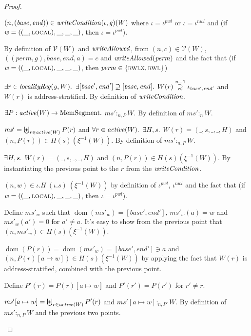 \documentclass[a4paper]{article}
\newcommand{\update}[2]{[#1 \mapsto #2]}
\newcommand\supsetsim{\mathrel{\ooalign{\raise.2ex\hbox{$\supset$}\cr
      \hidewidth\lower.8ex\hbox{\scalebox{0.9}{$\sim$}}\hidewidth\cr}}}
\newcommand{\nsupsim}[1][n]{\stackrel{\tiny{#1}}{\supsetsim}}
\DeclareMathOperator{\dom}{dom}
\newcommand{\var}[1]{\mathit{#1}}
\newcommand{\hs}{\var{ms}}
\newcommand{\ms}{\hs}
\newcommand{\gl}{\var{g}}
\newcommand{\addr}{\var{a}}
\newcommand{\start}{\var{base}}
\newcommand{\addrend}{\var{end}}
\newcommand{\heap}{\var{mem}}
\newcommand{\perm}{\var{perm}}
\newcommand{\nwl}{\var{nwl}}
\newcommand{\pwl}{\var{pwl}}
\newcommand{\plainfun}[2]{
  \ifthenelse{\equal{#2}{}}
  {\mathit{#1}}
  {\mathit{#1}(#2)}
}
\newcommand{\writeAllowed}[1]{\plainfun{writeAllowed}{#1}}
\newcommand{\writeCond}[1]{\plainfun{writeCondition}{#1}}
\newcommand{\activeReg}[1]{\plainfun{active}{#1}}
\newcommand{\heapSat}[3][\heap]{#1 :_{#2} #3}
\newcommand{\memSatPar}[4][n]{\heapSat[#2]{#1 , #4}{#3}}
\newcommand{\asmType}{\plaindom{AsmType}}
\newcommand{\plaindom}[1]{\mathrm{#1}}
\newcommand{\HeapSegments}{\plaindom{MemSegment}}
\newcommand{\intr}[2]{\mathcal{#1}}
\newcommand{\valueintr}[1]{\intr{V}{#1}}
\newcommand{\stdvr}{\valueintr{\asmType}}
\newcommand{\npair}[2][n]{\left(#1,#2 \right)}
\newcommand{\plainperm}[1]{\textsc{#1}}
\newcommand{\readwritel}{\plainperm{rwl}}
\newcommand{\rwlx}{\plainperm{rwlx}}
\newcommand{\local}{\plainperm{local}}
\begin{document}
 \begin{proof}
   \begin{enumproof}
   \item $\npair{(\start,\addrend)} \in \writeCond{}(\iota,\gl)(W)$ where $\iota
     = \iota^\pwl$ or $\iota = \iota^\nwl$ and (if $\var{w} =
     ((\_,\local),\_,\_,\_)$, then $\iota = \iota^\pwl$).

     By definition of $\stdvr(W)$ and $\writeAllowed{}$, from
     $\npair{c}\in\stdvr(W)$, $((\perm,\gl),\start,\addrend,\addr) = c$ and
     $\writeAllowed{\perm}$ and the fact that (if $\var{w} =
     ((\_,\local),\_,\_,\_)$, then $\perm \in \{\rwlx,\readwritel \}$)
   \item $\exists r \in \var{localityReg}(\gl,W) \ldotp$ $\exists
     [\start',\addrend'] \supseteq [\start,\addrend] \ldotp$ $W(r)\nsupsim[n-1]
     \iota_{\start',\addrend'}$ and $W(r)$ is address-stratified. By definition
     of $\writeCond{}$.
   \item $\exists P : \activeReg{W} \rightarrow \HeapSegments \ldotp$
     $\memSatPar{\ms'}{W}{P}$. By definition of $\heapSat[\ms']{n}{W}$.
   \item $\ms' = \biguplus_{r\in\activeReg{W}}P(r)$ and $\forall r \in
     \activeReg{W} \ldotp$ $\exists H,s \ldotp$ $W(r) = (\_,s,\_,\_,H)$ and
     $\npair[n]{P(r)} \in H(s)(\xi^{-1}(W))$. By definition of
     $\memSatPar{\ms'}{W}{P}$.
   \item $\exists H,s \ldotp$ $W(r) = (\_,s,\_,\_,H)$ and
     $\npair[n]{P(r)} \in H(s)(\xi^{-1}(W))$. By instantiating the previous
     point to the $r$ from the $\writeCond{}$.
   \item $\npair{w} \in \iota.H~(\iota.s)~(\xi^{-1}(W))$ by definition of
     $\iota^\pwl$, $\iota^\nwl$ and the fact that (if $\var{w} =
     ((\_,\local),\_,\_,\_)$, then $\iota = \iota^\pwl$).
   \item Define $\ms'_w$ such that $\dom(\ms'_w) = [\start',\addrend']$,
     $\ms'_w(\addr) = w$ and $\ms'_w(\addr') = 0$ for $\addr' \neq \addr$. It's
     easy to show from the previous point that $\npair{\ms'_w} \in
     H(s)(\xi^{-1}(W))$.
   \item $\dom(P(r)) = \dom(\ms'_w) = [\start',\addrend'] \ni \addr$ and
     $\npair{P(r)\update{\addr}{w}} \in H(s)(\xi^{-1}(W))$ by applying the fact
     that $W(r)$ is address-stratified, combined with the previous point.
   \item Define $P'(r) = P(r)\update{a}{w}$ and $P'(r') = P(r')$ for $r' \neq r$.
   \item $\ms'\update{a}{w} = \biguplus_{r\in\activeReg{W}}
     P'(r)$ and $\ms'\update{a}{w} :_{n,P'} W$. By definition of
     $\memSatPar{\ms'}{W}{P}$ and the previous two points.
   \end{enumproof}
 \end{proof}
  
\end{document}
